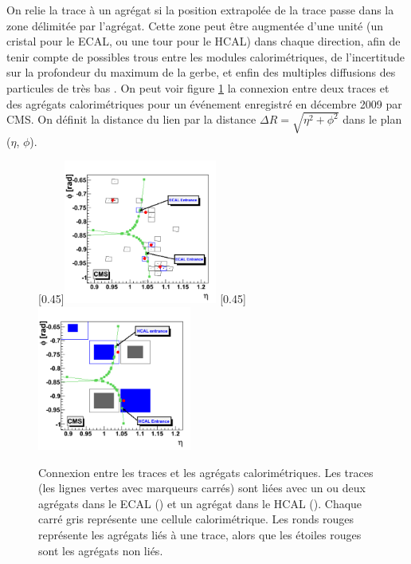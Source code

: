 On relie la trace à un agrégat si la position extrapolée de la trace passe dans la zone délimitée par l'agrégat. Cette zone peut être augmentée d'une unité (un cristal pour le ECAL, ou une tour pour le HCAL) dans chaque direction, afin de tenir compte de possibles trous entre les modules calorimétriques, de l'incertitude sur la profondeur du maximum de la gerbe, et enfin des multiples diffusions des particules de très bas \pt. On peut voir figure \ref{fig:pf_links} la connexion entre deux traces et des agrégats calorimétriques pour un événement enregistré en décembre 2009 par CMS. On définit la distance du lien par la distance $\Delta R = \sqrt{\eta^2 + \phi^2}$ dans le plan ($\eta$, $\phi$).

\begin{figure}
  [0.45\textwidth]{\includegraphics[width=0.45\textwidth]{chapitre3/figs/pf_links_ecal.png}}\hfill
  [0.45\textwidth]{\includegraphics[width=0.45\textwidth]{chapitre3/figs/pf_links_hcal.png}}
  \caption{Connexion entre les traces et les agrégats calorimétriques. Les traces (les lignes vertes avec marqueurs carrés) sont liées avec un ou deux agrégats dans le ECAL () et un agrégat dans le HCAL (). Chaque carré gris représente une cellule calorimétrique. Les ronds rouges représente les agrégats liés à une trace, alors que les étoiles rouges sont les agrégats non liés.}
  \label{fig:pf_links}
\end{figure}


